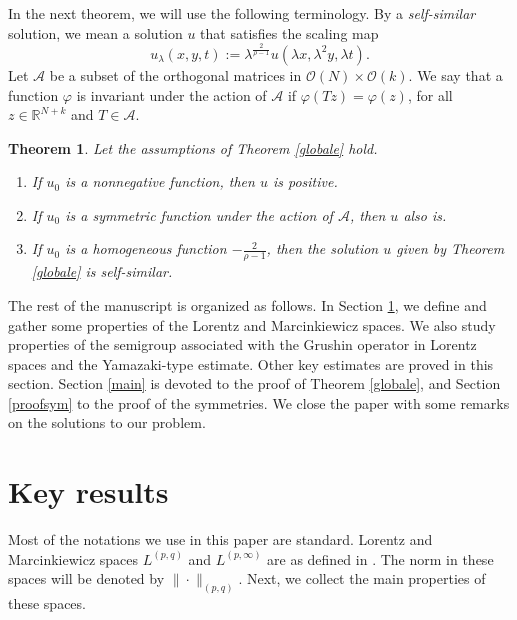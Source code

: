 \documentclass[12pt]{amsart}
\newtheorem{theorem}{Theorem}[section]
\newcommand{\R}{\mathbb{R}}
\begin{document}
In the next theorem, we will use the following terminology. By a \textit{self-similar} solution, we mean a solution $u$ that satisfies the scaling map
\begin{equation}\label{scalingmap}
	u_{\lambda}(x,y,t):=\lambda^{\frac{2}{\rho-1}}u(\lambda x, \lambda^2 y, \lambda t).
\end{equation}
Let $\mathcal{A}$ be a subset of the orthogonal matrices in $\mathcal{O}(N)\times \mathcal{O}(k)$. We say that a function $\varphi$ is invariant under the action of $\mathcal{A}$ if $\varphi(Tz) = \varphi(z)$, for all $z\in\R^{N+k}$ and $T\in \mathcal{A}$.






\begin{theorem}\label{self}
	Let the assumptions of Theorem \ref{globale} hold. 
	\begin{enumerate}
		\item[(a)] If $u_0$ is a nonnegative function, then $u$ is positive.
		\item[(b)] If $u_0$ is a symmetric function under the action of $\mathcal{A}$, then $u$ also is.
		\item[(c)] If $u_0$ is a homogeneous function $-\frac{2}{\rho-1}$, then the solution $u$ given by Theorem \ref{globale} is self-similar.
	\end{enumerate} 
\end{theorem}



The rest of the manuscript is organized as follows. In Section \ref{pre}, we define and gather some properties of the Lorentz and Marcinkiewicz spaces. We also study properties of the semigroup associated with the Grushin operator in Lorentz spaces and the Yamazaki-type estimate. Other key estimates are proved in this section. Section \ref{main} is devoted to the proof of Theorem \ref{globale}, and Section \ref{proofsym} to the proof of the symmetries. We close the paper with some remarks on the solutions to our problem.



\section{Key results}\label{pre}


Most of the notations we use in this paper are standard. Lorentz and Marcinkiewicz spaces $L^{(p,q)}$ and $L^{(p,\infty)}$ are as defined in \cite{bergh, FVR}. The norm in these spaces will be denoted by $\| \cdot \|_{(p,q)}$. Next, we collect the main properties of these spaces. 
\end{document}
